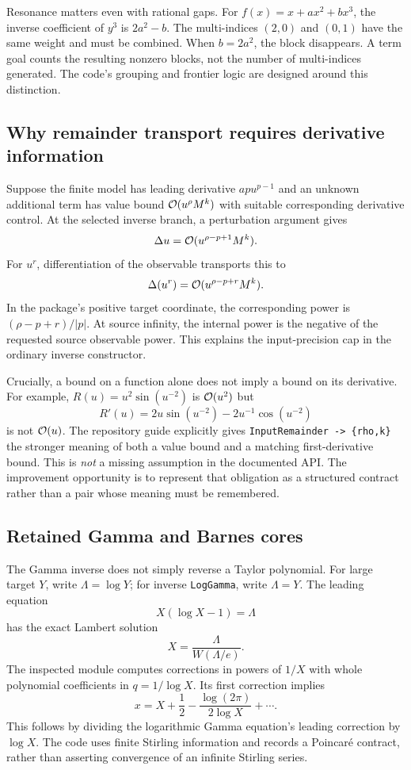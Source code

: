Resonance matters even with rational gaps. For
$f(x)=x+a x^2+b x^3$, the inverse coefficient of $y^3$ is $2a^2-b$. The multi-indices $(2,0)$ and $(0,1)$ have the same weight and must be combined. When $b=2a^2$, the block disappears. A term goal counts the resulting nonzero blocks, not the number of multi-indices generated. The code's grouping and frontier logic are designed around this distinction.\cite{core}

\subsection{Why remainder transport requires derivative information}

Suppose the finite model has leading derivative $ap u^{p-1}$ and an unknown additional term has value bound $\mathcal O(u^\rho M^k)$ with suitable corresponding derivative control. At the selected inverse branch, a perturbation argument gives
\[
 \Delta u=\mathcal O(u^{\rho-p+1}M^k).
\]
For $u^r$, differentiation of the observable transports this to
\begin{equation}\label{eq:transport}
 \Delta(u^r)=\mathcal O(u^{\rho-p+r}M^k).
\end{equation}
In the package's positive target coordinate, the corresponding power is
$(\rho-p+r)/|p|$. At source infinity, the internal power is the negative of the requested source observable power. This explains the input-precision cap in the ordinary inverse constructor.\cite{core}

Crucially, a bound on a function alone does not imply a bound on its derivative. For example, $R(u)=u^2\sin(u^{-2})$ is $\mathcal O(u^2)$ but
\[
 R'(u)=2u\sin(u^{-2})-2u^{-1}\cos(u^{-2})
\]
is not $\mathcal O(u)$. The repository guide explicitly gives \texttt{InputRemainder -> \{rho,k\}} the stronger meaning of both a value bound and a matching first-derivative bound. This is \emph{not} a missing assumption in the documented API. The improvement opportunity is to represent that obligation as a structured contract rather than a pair whose meaning must be remembered.\cite{guide}

\subsection{Retained Gamma and Barnes cores}

The Gamma inverse does not simply reverse a Taylor polynomial. For large target $Y$, write $\Lambda=\log Y$; for inverse \texttt{LogGamma}, write $\Lambda=Y$. The leading equation
\[
 X(\log X-1)=\Lambda
\]
has the exact Lambert solution
\[
 X=\frac{\Lambda}{W(\Lambda/e)}.
\]
The inspected module computes corrections in powers of $1/X$ with whole polynomial coefficients in $q=1/\log X$. Its first correction implies
\[
 x=X+\frac12-\frac{\log(2\pi)}{2\log X}+\cdots.
\]
This follows by dividing the logarithmic Gamma equation's leading correction by $\log X$. The code uses finite Stirling information and records a Poincar\'e contract, rather than asserting convergence of an infinite Stirling series.\cite{gammainverse,article}

